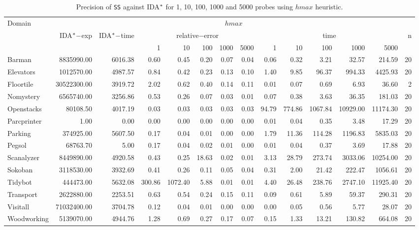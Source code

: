 \begin{table}[]
\tiny\setlength{\tabcolsep}{2pt}
\centering
\caption{Precision of \texttt{SS} against IDA$\sp{*}$ for 1, 10, 100, 1000 and 5000 probes using $hmax$ heuristic.}
\label{tb:comparison}
\begin{tabular}{lrrrrrrrrrrrrr}
\hline
\multirow{3}{*}{Domain} & \multicolumn{13}{c}{$hmax$}                                                                                                                     \\ \cline{2-14} & \multirow{2}{*}{IDA$\sp{*}-$exp} & \multirow{2}{*}{IDA$\sp{*}-$time} & \multicolumn{5}{c}{relative$-$error} & \multicolumn{5}{c}{time}   & \multirow{2}{*}{n} \\ \cline{4-13}
                        &                              &                       & 1   & 10   & 100   & 1000   & 5000   & 1 & 10 & 100 & 1000 & 5000 &                    \\ \hline
Barman & 8835990.00& 6016.38& 0.60& 0.45& 0.20& 0.07& 0.04& 0.06& 0.32& 3.21& 32.57& 214.59& 20\\
Elevators & 1012570.00& 4987.57& 0.84& 0.42& 0.23& 0.13& 0.10& 1.40& 9.85& 96.37& 994.33& 4425.93& 20\\
Floortile & 30522300.00& 3919.72& 2.02& 0.62& 0.40& 0.14& 0.11& 0.01& 0.07& 0.69& 6.93& 36.60& 2\\
Nomystery & 6565740.00& 3256.86& 0.53& 0.26& 0.07& 0.03& 0.01& 0.07& 0.38& 3.63& 36.35& 181.03& 20\\
Openstacks & 80108.50& 4017.19& 0.03& 0.03& 0.03& 0.03& 0.03& 94.79& 774.86& 1067.84& 10929.00& 11174.30& 20\\
Parcprinter & 1.00& 0.00& 0.00& 0.00& 0.00& 0.00& 0.00& 0.01& 0.04& 0.35& 3.48& 17.29& 20\\
Parking & 374925.00& 5607.50& 0.17& 0.04& 0.01& 0.00& 0.00& 1.79& 11.36& 114.28& 1196.83& 5835.03& 20\\
Pegsol & 68763.70& 5.00& 0.17& 0.04& 0.02& 0.01& 0.00& 0.01& 0.04& 0.37& 3.69& 17.88& 20\\
Scanalyzer & 8449890.00& 4920.58& 0.43& 0.25& 18.63& 0.02& 0.01& 3.13& 28.79& 273.74& 3033.06& 10254.00& 20\\
Sokoban & 3118530.00& 3932.69& 0.41& 0.26& 0.11& 0.05& 0.04& 0.31& 2.00& 21.42& 222.47& 1056.61& 20\\
Tidybot & 444473.00& 5632.08& 300.86& 1072.40& 5.88& 0.01& 0.01& 4.40& 26.48& 238.76& 2747.10& 11925.40& 20\\
Transport & 2622880.00& 2253.51& 0.63& 0.54& 0.24& 0.15& 0.11& 0.09& 0.61& 5.89& 59.37& 290.31& 20\\
Visitall & 71032400.00& 3704.78& 0.12& 0.04& 0.01& 0.00& 0.00& 0.00& 0.05& 0.56& 5.77& 28.07& 20\\
Woodworking & 5139070.00& 4944.76& 1.28& 0.69& 0.27& 0.17& 0.07& 0.15& 1.33& 13.21& 130.82& 664.08& 20\\ \hline
\end{tabular}
\end{table}

